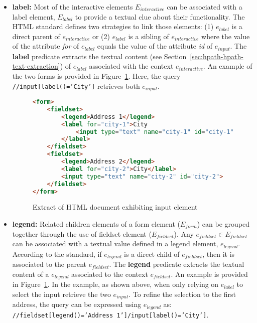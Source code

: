\begin{itemize}
    \item \textbf{label:} Most of the interactive elements $E_{interactive}$ can be associated with a label element, $E_{label}$ to provide a textual clue about their functionality. The HTML standard defines two strategies to link those elements: (1) $e_{label}$ is a direct parent of $e_{interactive}$ or (2) $e_{label}$ is a sibling of $e_{interactive}$ where the value of the attribute \emph{for} of $e_{label}$ equals the value of the attribute \emph{id} of $e_{input}$. The \textbf{label} predicate extracts the textual content (see Section~\ref{sec:hpath-hpath-text-extraction}) of $e_{label}$ associated with the context $e_{interactive}$. An example of the two forms is provided in Figure~\ref{fig:html-document-input}. Here, the query \texttt{//input[label()='City']} retrieves both $e_{input}$.
    
\begin{figure}[h!]
\centering
\caption{Extract of HTML document exhibiting input element}
\label{fig:html-document-input}
\begin{minipage}{0.8\linewidth}
\begin{lstlisting}[language=HTML]
<form>
    <fieldset>
        <legend>Address 1</legend>
        <label for="city-1">City
            <input type="text" name="city-1" id="city-1">
        </label>
    </fieldset>
    <fieldset>
        <legend>Address 2</legend>
        <label for="city-2">City</label>
        <input type="text" name="city-2" id="city-2">
    </fieldset>
</form>
\end{lstlisting}
\end{minipage}
\end{figure}
    
    \item \textbf{legend:} Related children elements of a form element ($E_{form}$) can be grouped together through the use of fieldset element ($E_{fieldset}$). Any $e_{fieldset} \in E_{fieldset}$ can be associated with a textual value defined in a legend element, $e_{legend}$. According to the standard, if $e_{legend}$ is a direct child of $e_{fieldset}$, then it is associated to the parent $e_{fieldset}$. The \textbf{legend} predicate extracts the textual content of a $e_{legend}$ associated to the context $e_{fieldset}$. An example is provided in Figure~\ref{fig:html-document-input}. In the example, as shown above, when only relying on $e_{label}$ to select the input retrieve the two $e_{input}$. To refine the selection to the first address, the query can be expressed using $e_{legend}$ as: \texttt{//fieldset[legend()='Address 1']/input[label()='City']}.
    

\end{itemize}
